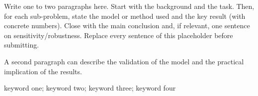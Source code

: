 %
%
%
%

Write one to two paragraphs here. Start with the background and the task.
Then, for each sub-problem, state the model or method used and the key
result (with concrete numbers). Close with the main conclusion and, if
relevant, one sentence on sensitivity/robustness. Replace every sentence
of this placeholder before submitting.

A second paragraph can describe the validation of the model and the
practical implication of the results.

\begin{keywords}
keyword one; keyword two; keyword three; keyword four
\end{keywords}
